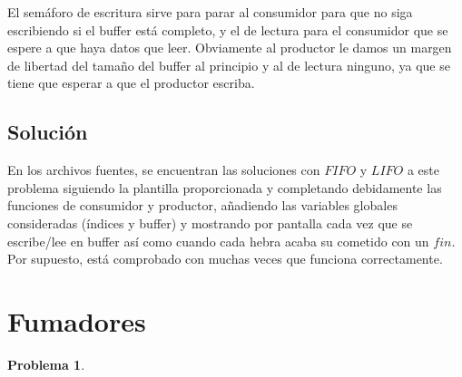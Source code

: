 \documentclass[11pt]{article}
\theoremstyle{ejercicio-style}
\newtheorem{ejer}{Problema}
\begin{document}
El semáforo de escritura sirve para parar al consumidor para que no siga escribiendo si el buffer está completo, y el de lectura para el consumidor que se espere a que haya datos que leer. Obviamente al productor le damos un margen de libertad del tamaño del buffer al principio y al de lectura ninguno, ya que se tiene que esperar a que el productor escriba.

\subsection*{Solución}
\label{sec::solucion}
En los archivos fuentes, se encuentran las soluciones con $FIFO$ y $LIFO$ a este problema siguiendo la plantilla proporcionada y completando debidamente las funciones de consumidor y productor, añadiendo las variables globales consideradas (índices y buffer) y mostrando por pantalla cada vez que se escribe/lee en buffer así como cuando cada hebra acaba su cometido con un $fin$. Por supuesto, está comprobado con muchas veces que funciona correctamente.

\section*{Fumadores}
\label{sec::fumadores}

\begin{ejer}

\end{ejer}
\end{document}
